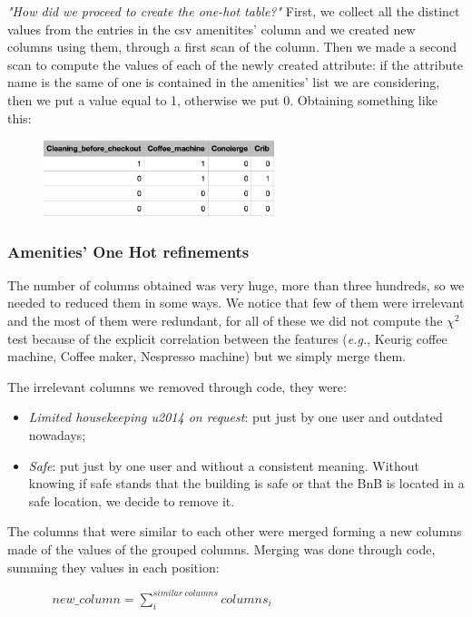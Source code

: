 \textit{"How did we proceed to create the one-hot table?"} First, we collect all the distinct values from the entries in the csv amenitites' column and we created new columns using them, through a first scan of the column. Then we made a second scan to compute the values of each of the newly created attribute: if the attribute name is the same of one is contained in the amenities' list we are considering, then we put a value equal to 1, otherwise we put 0. Obtaining something like this:

\begin{figure}[H]
	\centering
	\includegraphics[width=0.6\textwidth]{img/onehot.png}  
\end{figure}

\subsubsection{Amenities' One Hot refinements}
The number of columns obtained was very huge, more than three hundreds, so we needed to reduced them in some ways. We notice that few of them were irrelevant and the most of them were redundant, for all of these we did not compute the $\chi^2$ test because of the explicit correlation between the features (\textit{e.g.}, Keurig coffee machine, Coffee maker, Nespresso machine) but we simply merge them.

The irrelevant columns we removed through code, they were: 
\begin{itemize}
	\item \textit{Limited housekeeping u2014 on request}: put just by one user and outdated nowadays;
	\item \textit{Safe}: put just by one user and without a consistent meaning. Without knowing if safe stands that the building is safe or that the BnB is located in a safe location, we decide to remove it.
\end{itemize}

The columns that were similar to each other were merged forming a new columns made of the values of the grouped columns. Merging was done through code, summing they values in each position:

$
	\ \ \ \	\ \ \ \	\ \ \ \	\ \ \ \		new\_column = \sum^{similar \ columns}_{i} columns_i
$

